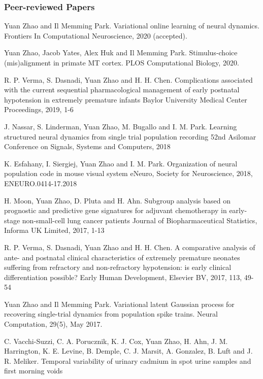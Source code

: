 \documentclass[12pt, letterpaper]{article}
\begin{document}
\subsubsection*{Peer-reviewed Papers}
\begin{enumerate}[label={[\arabic*]}]
    \item Yuan Zhao and Il Memming Park. 
    Variational online learning of neural dynamics. Frontiers In Computational Neuroscience, 2020 (accepted).
    \item Yuan Zhao, Jacob Yates, Alex Huk and Il Memming Park. Stimulus-choice (mis)alignment in primate MT cortex. PLOS Computational Biology, 2020.
    \item R. P. Verma, S. Dasnadi, Yuan Zhao and H. H. Chen.
    Complications associated with the current sequential pharmacological management of early postnatal hypotension in extremely premature infants 
    Baylor University Medical Center Proceedings, 2019, 1-6 
    \item J. Nassar, S. Linderman, Yuan Zhao, M. Bugallo and I. M. Park.
    Learning structured neural dynamics from single trial population recording 
    52nd Asilomar Conference on Signals, Systems and Computers, 2018 
    \item K. Esfahany, I. Siergiej, Yuan Zhao and I. M. Park.
    Organization of neural population code in mouse visual system 
    eNeuro, Society for Neuroscience, 2018, ENEURO.0414-17.2018
    \item H. Moon, Yuan Zhao, D. Pluta and H. Ahn.
    Subgroup analysis based on prognostic and predictive gene signatures for adjuvant chemotherapy in early-stage non-small-cell lung cancer patients 
    Journal of Biopharmaceutical Statistics, Informa UK Limited, 2017, 1-13 
    \item R. P. Verma, S. Dasnadi, Yuan Zhao and H. H. Chen.
    A comparative analysis of ante- and postnatal clinical characteristics of extremely premature neonates suffering from refractory and non-refractory hypotension: is early clinical differentiation possible? Early Human Development, Elsevier BV, 2017, 113, 49-54 
    \item Yuan Zhao and Il Memming Park. Variational latent Gaussian process for recovering single-trial dynamics from population spike trains. Neural Computation, 29(5), May 2017.
    \item C. Vacchi-Suzzi, C. A. Porucznik, K. J. Cox, Yuan Zhao, H. Ahn, J. M. Harrington, K. E. Levine, B. Demple, C. J. Marsit, A. Gonzalez, B. Luft and J. R. Meliker.
    Temporal variability of urinary cadmium in spot urine samples and first morning voids 

\end{enumerate}
\end{document}
